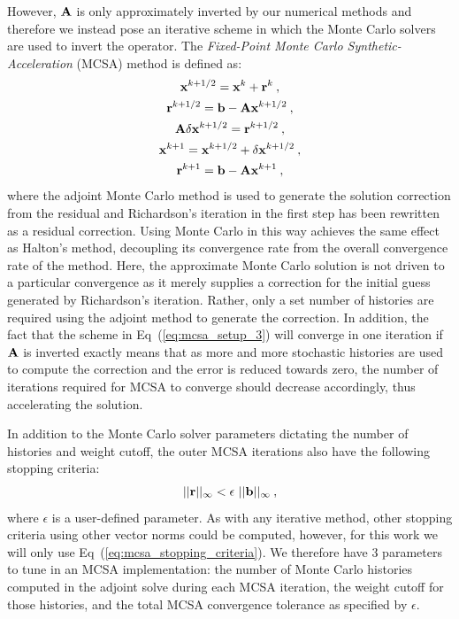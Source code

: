 However, $\mathbf{A}$ is only approximately inverted by our numerical
methods and therefore we instead pose an iterative scheme in which the
Monte Carlo solvers are used to invert the operator. The
\textit{Fixed-Point Monte Carlo Synthetic-Acceleration} (MCSA) method
is defined as:
\begin{subequations}
  \begin{gather}
    \mathbf{x}^{k+1/2} = \mathbf{x}^k + \mathbf{r}^k\:,\\
    \mathbf{r}^{k+1/2} = \mathbf{b} - \mathbf{A}\mathbf{x}^{k+1/2}\:,\\
    \mathbf{A}\delta\mathbf{x}^{k+1/2} = \mathbf{r}^{k+1/2}\:,\\
    \mathbf{x}^{k+1} = \mathbf{x}^{k+1/2} + \delta \mathbf{x}^{k+1/2}\:,\\
    \mathbf{r}^{k+1} = \mathbf{b} - \mathbf{A}\mathbf{x}^{k+1}\:,
  \end{gather}
  \label{eq:mcsa}
\end{subequations}
where the adjoint Monte Carlo method is used to generate the solution
correction from the residual and Richardson's iteration in the first
step has been rewritten as a residual correction. Using Monte Carlo in
this way achieves the same effect as Halton's method, decoupling its
convergence rate from the overall convergence rate of the
method. Here, the approximate Monte Carlo solution is not driven to a
particular convergence as it merely supplies a correction for the
initial guess generated by Richardson's iteration. Rather, only a set
number of histories are required using the adjoint method to generate
the correction. In addition, the fact that the scheme in
Eq~(\ref{eq:mcsa_setup_3}) will converge in one iteration if $\mathbf{A}$
is inverted exactly means that as more and more stochastic histories
are used to compute the correction and the error is reduced towards
zero, the number of iterations required for MCSA to converge should
decrease accordingly, thus accelerating the solution.

In addition to the Monte Carlo solver parameters dictating the number
of histories and weight cutoff, the outer MCSA iterations also have
the following stopping criteria:
\begin{equation}
  ||\ve{r}||_\infty < \epsilon \ ||\ve{b}||_\infty\:,
  \label{eq:mcsa_stopping_criteria}
\end{equation}
where $\epsilon$ is a user-defined parameter. As with any iterative
method, other stopping criteria using other vector norms could be
computed, however, for this work we will only use
Eq~(\ref{eq:mcsa_stopping_criteria}). We therefore have 3 parameters
to tune in an MCSA implementation: the number of Monte Carlo histories
computed in the adjoint solve during each MCSA iteration, the weight
cutoff for those histories, and the total MCSA convergence tolerance
as specified by $\epsilon$.

